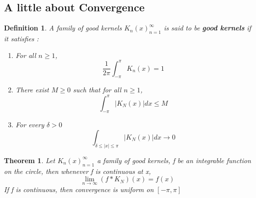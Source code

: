 \documentclass{article}
\newtheorem{theorem}{Theorem}
\newtheorem{definition}{Definition}
\begin{document}
\subsection{A little about Convergence }
\begin{definition}%
    A family of good kernels $ {K_n(x)}_{n=1}^{\infty} $ is said to be \textbf{good kernels} if it satisfies :
    \begin{enumerate}
        \item For all $ n \geqslant 1  $, \[ \frac{1}{2\pi}\int_{-\pi}^{\pi} K_n(x)=1\]
        \item There exist $ M \geqslant 0 $ such that for all $ n \geqslant 1 $,\[\int_{-\pi}^{\pi}\left\lvert K_N(x) \right\rvert  dx \leqslant M\]
        \item For every $ \delta > 0 $ \[ \int_{\delta \leqslant \left\lvert x \right\rvert \leqslant \pi} \left\lvert K_N(x) \right\rvert  dx \rightarrow 0\]
    \end{enumerate}
\end{definition}
\begin{theorem}
    Let $ {K_n(x)}_{n=1}^{\infty}  $ a family of good kernels, f be an integrable function on the circle, then whenever f is continuous at x,\[ \lim_{n\rightarrow \infty}(f*K_N)(x)=f(x)\]
    If f is continuous, then convergence is uniform on $ [-\pi,\pi] $
\end{theorem}
\end{document}
